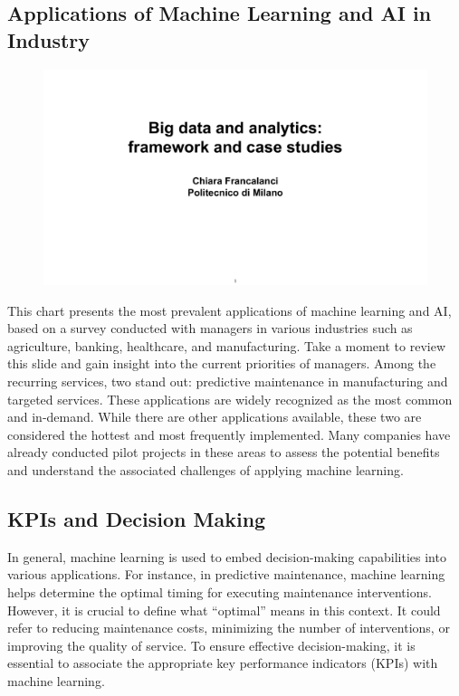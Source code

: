 \subsection{Applications of Machine Learning and AI in
  Industry}\label{applications-of-machine-learning-and-ai-in-industry}


\begin{figure}[!h]
  \centering
  \includegraphics[page=19, trim = 0cm 1.5cm 1.5cm 0.7cm, clip, width=\imagewidth]{images/06 - BIG_DATA.pdf}
\end{figure}

This chart presents the most prevalent applications of machine learning
and AI, based on a survey conducted with managers in various industries
such as agriculture, banking, healthcare, and manufacturing. Take a
moment to review this slide and gain insight into the current priorities
of managers. Among the recurring services, two stand out: predictive
maintenance in manufacturing and targeted services. These applications
are widely recognized as the most common and in-demand. While there are
other applications available, these two are considered the hottest and
most frequently implemented. Many companies have already conducted pilot
projects in these areas to assess the potential benefits and understand
the associated challenges of applying machine learning.

\subsection{KPIs and Decision Making}

In general, machine learning is used to embed decision-making
capabilities into various applications. For instance, in predictive
maintenance, machine learning helps determine the optimal timing for
executing maintenance interventions. However, it is crucial to define
what ``optimal'' means in this context. It could refer to reducing
maintenance costs, minimizing the number of interventions, or improving
the quality of service. To ensure effective decision-making, it is
essential to associate the appropriate key performance indicators (KPIs)
with machine learning.

